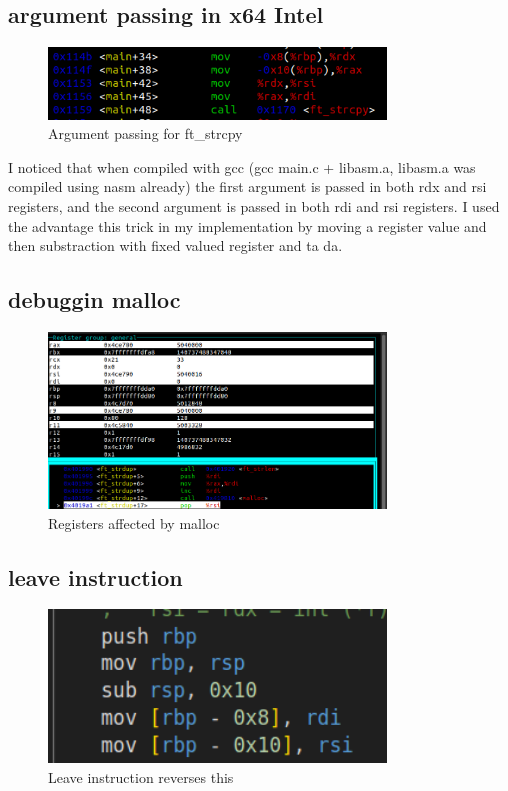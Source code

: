 \documentclass{article}
\begin{document}
\subsection{argument passing in x64 Intel}
\begin{figure}[H]
    \centering
    \includegraphics[width=0.8\textwidth]{trick.png}
    \caption{Argument passing for ft\_strcpy}
    \label{fig:trick}
\end{figure}

I noticed that when compiled with gcc (gcc main.c + libasm.a, libasm.a was compiled using nasm already) the first argument is passed in both rdx and rsi registers, and the second argument is passed in both rdi and rsi registers. I used the advantage this trick in my implementation by moving a register value and then substraction with fixed valued register and ta da.

\subsection{debuggin malloc}
\begin{figure}[H]
    \centering
    \includegraphics[width=0.8\textwidth]{regs_after_malloc.png}
    \caption{Registers affected by malloc}
    \label{fig:reg_malloc}
\end{figure}

\subsection{leave instruction}
\begin{figure}[H]
    \centering
    \includegraphics[width=0.8\textwidth]{leave.png}
    \caption{Leave instruction reverses this}
    \label{fig:leave}
\end{figure}
\end{document}
